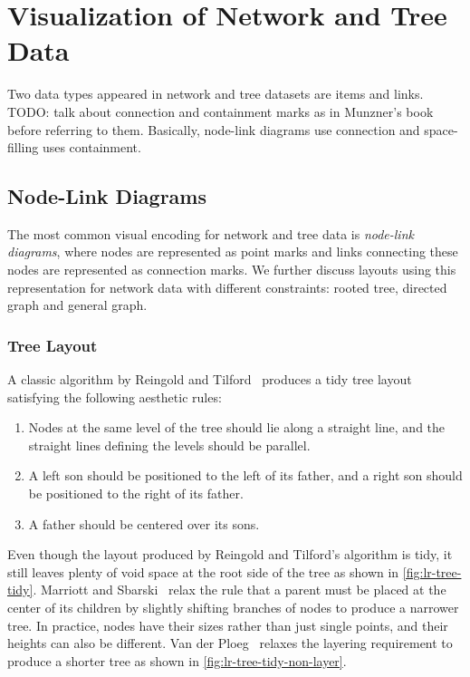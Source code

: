 \section{Visualization of Network and Tree Data}

Two data types appeared in network and tree datasets are items and links.
TODO: talk about connection and containment marks as in Munzner's book before referring to them. Basically, node-link diagrams use connection and space-filling uses containment.

\subsection{Node-Link Diagrams}
The most common visual encoding for network and tree data is \emph{node-link diagrams}, where nodes are represented as point marks and links connecting these nodes are represented as connection marks. We further discuss layouts using this representation for network data with different constraints: rooted tree, directed graph and general graph.

\subsubsection{Tree Layout}
A classic algorithm by Reingold and Tilford~\cite{Reingold1981} produces a tidy tree layout satisfying the following aesthetic rules:
\begin{enumerate}
	\item Nodes at the same level of the tree should lie along a straight line, and the straight lines defining the levels should be parallel.
	\item A left son should be positioned to the left of its father, and a right son should be positioned to the right of its father.
	\item A father should be centered over its sons.
\end{enumerate} 

Even though the layout produced by Reingold and Tilford's algorithm is tidy, it still leaves plenty of void space at the root side of the tree as shown in \autoref{fig:lr-tree-tidy}. Marriott and Sbarski~\cite{Marriott2007} relax the rule that a parent must be placed at the center of its children by slightly shifting branches of nodes to produce a narrower tree. In practice, nodes have their sizes rather than just single points, and their heights can also be different. Van der Ploeg~\cite{VanderPloeg2014} relaxes the layering requirement to produce a shorter tree as shown in \autoref{fig:lr-tree-tidy-non-layer}.

